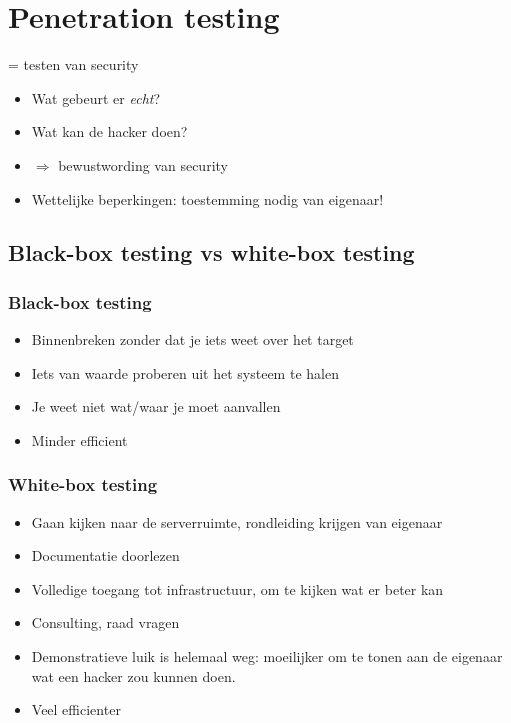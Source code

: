\documentclass{article}
\begin{document}
\section{Penetration testing}

= testen van security

\begin{itemize}
    \item Wat gebeurt er \textit{echt}?
    \item Wat kan de hacker doen?
    \item $\Rightarrow$ bewustwording van security
    \item Wettelijke beperkingen: toestemming nodig van eigenaar!
\end{itemize}

\subsection{Black-box testing vs white-box testing}

\subsubsection{Black-box testing}

\begin{itemize}
    \item Binnenbreken zonder dat je iets weet over het target
    \item Iets van waarde proberen uit het systeem te halen
    \item Je weet niet wat/waar je moet aanvallen
    \item Minder efficient
\end{itemize}

\subsubsection{White-box testing}

\begin{itemize}
    \item Gaan kijken naar de serverruimte, rondleiding krijgen van eigenaar
    \item Documentatie doorlezen
    \item Volledige toegang tot infrastructuur, om te kijken wat er beter kan
    \item Consulting, raad vragen
    \item Demonstratieve luik is helemaal weg: moeilijker om te tonen aan de eigenaar wat een hacker zou kunnen doen.
    \item Veel efficienter
\end{itemize}
\end{document}
